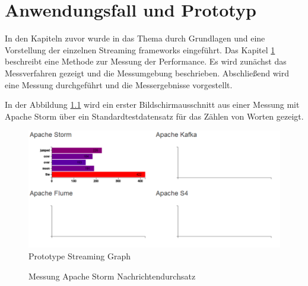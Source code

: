 \chapter{Anwendungsfall und Prototyp}
\label{chapter:prototype}

In den Kapiteln zuvor wurde in das Thema durch Grundlagen und eine Vorstellung der einzelnen Streaming frameworks eingeführt. Das Kapitel \ref{chapter:prototype} beschreibt eine Methode zur Messung der Performance. Es wird zunächst das Messverfahren gezeigt und die Messumgebung beschrieben. Abschließend wird eine Messung durchgeführt und die Messergebnisse vorgestellt.

In der Abbildung \ref{fig:prototypeStreamingGraph} wird ein erster Bildschirmausschnitt aus einer Messung mit Apache Storm über ein Standardtestdatensatz für das Zählen von Worten gezeigt.

\begin{figure}[htb!]
\centering
\includegraphics[width=1.0\textwidth]{bilder/PrototypeStreamingGraph.png}
\caption{Prototype Streaming Graph
\label{fig:prototypeStreamingGraph}}
\end{figure}

\begin{figure}
\caption{Messung Apache Storm Nachrichtendurchsatz
\label{fig:messungStormNd}}
\end{figure}

